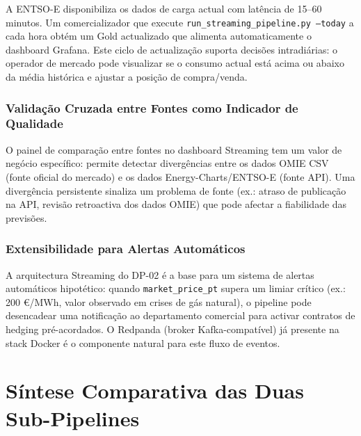 \documentclass[11pt,a4paper]{article}
\begin{document}
A ENTSO-E disponibiliza os dados de carga actual com latência de 15--60 minutos. Um comercializador que execute \texttt{run\_streaming\_pipeline.py --today} a cada hora obtém um Gold actualizado que alimenta automaticamente o dashboard Grafana. Este ciclo de actualização suporta decisões intradiárias: o operador de mercado pode visualizar se o consumo actual está acima ou abaixo da média histórica e ajustar a posição de compra/venda.

\subsubsection{Validação Cruzada entre Fontes como Indicador de Qualidade}

O painel de comparação entre fontes no dashboard Streaming tem um valor de negócio específico: permite detectar divergências entre os dados OMIE CSV (fonte oficial do mercado) e os dados Energy-Charts/ENTSO-E (fonte API). Uma divergência persistente sinaliza um problema de fonte (ex.: atraso de publicação na API, revisão retroactiva dos dados OMIE) que pode afectar a fiabilidade das previsões.

\subsubsection{Extensibilidade para Alertas Automáticos}

A arquitectura Streaming do DP-02 é a base para um sistema de alertas automáticos hipotético: quando \texttt{market\_price\_pt} supera um limiar crítico (ex.: 200 €/MWh, valor observado em crises de gás natural), o pipeline pode desencadear uma notificação ao departamento comercial para activar contratos de hedging pré-acordados. O Redpanda (broker Kafka-compatível) já presente na stack Docker é o componente natural para este fluxo de eventos.

\section{Síntese Comparativa das Duas Sub-Pipelines}
\end{document}
